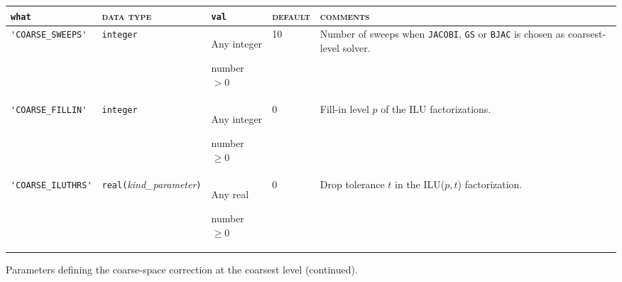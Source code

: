 \bsideways
\begin{center}
\begin{tabular}{|p{3.9cm}|l|p{2cm}|p{1.5cm}|p{7.5cm}|}
\hline
\verb|what|              & \textsc{data type}        &  \verb|val|      &  \textsc{default}  &
\textsc{comments} \\ \hline
\verb|'COARSE_SWEEPS'| & \verb|integer|                         
                         & Any integer \par number $> 0$
                         & 10
                         & Number of sweeps when \verb|JACOBI|, \verb|GS| or \verb|BJAC|
                           is chosen as coarsest-level solver. \\ \hline
\verb|'COARSE_FILLIN'| & \verb|integer|
                         & Any integer \par number $\ge 0$
                         & 0
                         & Fill-in level $p$ of the ILU factorizations. \\ \hline
\verb|'COARSE_ILUTHRS'|
                         & \verb|real(|\emph{kind\_parameter}\verb|)|
                         & Any real \par number $\ge 0$
                         & 0
                         & Drop tolerance $t$ in the ILU($p,t$) factorization. \\
\hline
\end{tabular}
\end{center}
\caption{Parameters defining the coarse-space correction at the coarsest
level (continued).\label{tab:p_coarse_1}} 
\esideways

